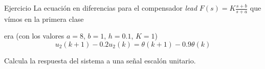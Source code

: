 \documentclass[presentation,aspectratio=169]{beamer}
\begin{document}
\begin{frame}[label={sec:org170387e}]{Ejercicio}
La ecuación en diferencias para el compensador \emph{lead} \(F(s)=K\frac{s+b}{s+a}\) que vímos en la primera clase
\begin{center}
\end{center}
era (con los valores  \(a=8\), \(b=1\), \(h=0.1\), \(K=1\))
\[ u_2(k+1) - 0.2u_2(k) = \theta(k+1) - 0.9\theta(k) \]

\alert{Calcula la respuesta del sistema a una señal escalón unitario.} 
\end{frame}
\end{document}
